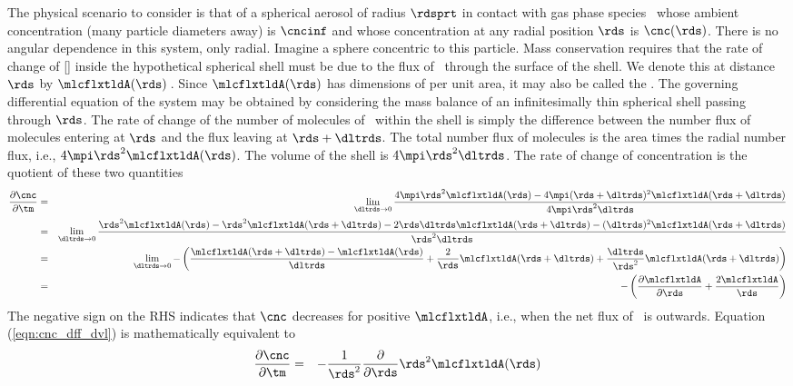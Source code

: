 \documentclass[12pt,twoside]{book}
\begin{document}
The physical scenario to consider is that of a spherical aerosol of
radius $\rdsprt$ in contact with gas phase species \A\ whose ambient
concentration (many particle diameters away) is $\cncinf$ and whose
concentration at any radial position $\rds$ is $\cnc(\rds)$.
There is no angular dependence in this system, only radial.
Imagine a sphere concentric to this particle.
Mass conservation requires that the rate of change of [\A] inside the 
hypothetical spherical shell must be due to the flux of \A\ through
the surface of the shell.  
We denote this  at distance $\rds$ by
$\mlcflxtldA(\rds)$\,\mlcxmSs.      
Since $\mlcflxtldA(\rds)$ has dimensions of per unit area, it may also
be called the .
The governing differential equation of the system may be obtained by
considering the mass balance of an infinitesimally thin spherical
shell passing through $\rds$.
The rate of change of the number of molecules of \A\ within the shell
is simply the difference between the number flux of molecules entering
at $\rds$ and the flux leaving at $\rds + \dltrds$. 
The total number flux of molecules is the area times the radial number
flux, i.e., $4 \mpi \rds^{2} \mlcflxtldA(\rds)$.
The volume of the shell is $4 \mpi \rds^{2} \dltrds$.
The rate of change of concentration is the quotient of these two
quantities 
\begin{eqnarray}
\frac{\partial \cnc}{\partial \tm } & = & \lim_{\dltrds \rightarrow 0}
\frac{4 \mpi \rds^{2} \mlcflxtldA(\rds) - 
4 \mpi ( \rds + \dltrds)^{2} \mlcflxtldA(\rds + \dltrds)
}{ 4 \mpi \rds^{2} \dltrds } \nonumber \\
& = & \lim_{\dltrds \rightarrow 0}
\frac{\rds^{2} \mlcflxtldA(\rds) - \rds^{2} \mlcflxtldA(\rds + \dltrds)
- 2 \rds \dltrds \mlcflxtldA(\rds + \dltrds) - (\dltrds)^{2} \mlcflxtldA(\rds + \dltrds)
}{ \rds^{2} \dltrds } \nonumber \\
& = & \lim_{\dltrds \rightarrow 0}
- \left( \frac{\mlcflxtldA (\rds + \dltrds) - \mlcflxtldA(\rds)}{\dltrds } +
\frac{2}{\rds } \mlcflxtldA(\rds + \dltrds) +
\frac{\dltrds}{\rds^{2} } \mlcflxtldA(\rds + \dltrds) \right) \nonumber \\
& = & - \left( \frac{\partial \mlcflxtldA}{\partial \rds } +
\frac{2 \mlcflxtldA}{\rds } \right)
\label{eqn:cnc_dff_dvl}
\end{eqnarray}
The negative sign on the RHS indicates that $\cnc$ decreases for
positive $\mlcflxtldA$, i.e., when the net flux of \A\ is outwards.
Equation (\ref{eqn:cnc_dff_dvl}) is mathematically equivalent to 
\begin{eqnarray}
\frac{\partial \cnc}{\partial \tm } & = & - \frac{1}{\rds^{2} } 
\frac{\partial}{\partial \rds } \rds^{2} \mlcflxtldA( \rds ) 
\label{eqn:cnc_dff}
\end{eqnarray}
\end{document}
